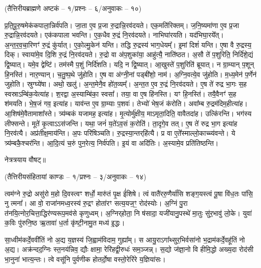 \centerline{\scriptsize (तैत्तिरीयब्राह्मणे अष्टकं – १/प्रश्नः – ६/अनुवाकः – १०)}

प्र॒ति॒पू॒रु॒षमेक॑कपाला॒न्निर्व॑पति। जा॒ता ए॒व प्र॒जा रु॒द्रान्नि॒रव॑दयते। एक॒मति॑\-रिक्तम्। ज॒नि॒ष्यमा॑णा ए॒व प्र॒जा रु॒द्रान्नि॒रव॑दयते। एक॑कपाला भवन्ति। ए॒क॒धैव रु॒द्रं नि॒रव॑दयते। नाभिघा॑रयति। यद॑भिघा॒रये᳚त्। अ॒न्त॒र॒व॒चा॒रिणꣳ॑ रु॒द्रं कु॑र्यात्। ए॒को॒ल्मु॒केन॑ यन्ति।
तद्धि रु॒द्रस्य॑ भाग॒धेयम्᳚। इ॒मां दिशं॑ यन्ति। ए॒षा वै रु॒द्रस्य॒ दिक्। स्वाया॑मे॒व दि॒शि रु॒द्रं नि॒रव॑दयते। रु॒द्रो वा अ॑प॒शुका॑या॒ आहु॑त्यै॒ नाति॑ष्ठत। अ॒सौ ते॑ प॒शुरिति॒ निर्दि॑शे॒द्यं द्वि॒ष्यात्। यमे॒व द्वेष्टि॑। तम॑स्मै प॒शुं निर्दि॑शति। यदि॒ न द्वि॒ष्यात्। आ॒खुस्ते॑ प॒शुरिति॑ ब्रूयात्।
न ग्रा॒म्यान् प॒शून् हि॒नस्ति॑। नार॒ण्यान्। च॒तु॒ष्प॒थे जु॑होति। ए॒ष वा अ॑ग्नी॒नां पड्बी॑शो॒ नाम॑। अ॒ग्नि॒वत्ये॒व जु॑होति। म॒ध्य॒मेन॑ प॒र्णेन॑ जुहोति। स्रुग्घ्ये॑षा। अथो॒ खलु॑। अ॒न्त॒मेनै॒व हो॑त॒व्यम्᳚। अ॒न्त॒त ए॒व रु॒द्रं नि॒रव॑दयते।
ए॒ष ते॑ रुद्र भा॒गः स॒ह स्वस्राऽम्बि॑क॒येत्या॑ह। श॒रद्वा अ॒स्याम्बि॑का॒ स्वसा᳚। तया॒ वा ए॒ष हि॑नस्ति। यꣳ हि॒नस्ति॑। तयै॒वैनꣳ॑ स॒ह श॑मयति। भे॒ष॒जं गव॒ इत्या॑ह। याव॑न्त ए॒व ग्रा॒म्याः प॒शवः॑। तेभ्यो॑ भेष॒जं क॑रोति। अवा᳚म्ब रु॒द्रम॑दिम॒हीत्या॑ह। आ॒शिष॑मे॒वैतामाशा᳚स्ते।
त्र्य॑म्बकं यजामह॒ इत्या॑ह। मृ॒त्योर्मु॑क्षीय॒ माऽमृता॒दिति॒ वावैतदा॑ह। उत्कि॑रन्ति। भग॑स्य लीफ्सन्ते। मूते॑ कृ॒त्वाऽऽस॑जन्ति। यथा॒ जनं॑ य॒ते॑ऽव॒सं क॒रोति॑। ता॒दृगे॒व तत्। ए॒ष ते॑ रुद्र भा॒ग इत्या॑ह नि॒रव॑त्यै। अप्र॑तीक्ष॒माय॑न्ति। अ॒पः परि॑षिञ्चति। \mbox{रु॒द्रस्या॒न्तर्‌\mbox{}हि॑त्यै}। प्र वा ए॒ते᳚स्माल्लो॒काच्च्य॑वन्ते। ये त्र्य॑म्बकै॒श्चर॑न्ति। आ॒दि॒त्यं च॒रुं पुन॒रेत्य॒ निर्व॑पति। इ॒यं वा अदि॑तिः। अ॒स्यामे॒व प्रति॑तिष्ठन्ति।

नेत्रत्रयाय वौषट्॥

{\small\closesection}


{}
\centerline{\scriptsize (तैत्तिरीयसंहितायां काण्डः – १/प्रश्नः – ३/अनुवाकः – १४)}

त्वम॑ग्ने रु॒द्रो असु॑रो म॒हो दि॒वस्त्वꣳ शर्धो॒ मारु॑तं पृ॒क्ष ई॑शिषे। त्वं वातै॑ररु॒णैर्या॑सि शङ्ग॒यस्त्वं पू॒षा वि॑ध॒तः पा॑सि॒ नु त्मना᳚।
आ वो॒ राजा॑नमध्व॒रस्य॑ रु॒द्रꣳ होता॑रꣳ सत्य॒यज॒ꣳ॒ रोद॑स्योः। अ॒ग्निं पु॒रा त॑नयि॒त्नोर॒चित्ता॒द्धिर॑ण्यरूप॒मव॑से कृणुध्वम्। अ॒ग्निर्‌होता॒ नि ष॑सादा॒ यजी॑यानु॒पस्थे॑ मा॒तुः सु॑र॒भावु॑ लो॒के। युवा॑ क॒विः पु॑रुनि॒ष्ठ ऋ॒तावा॑ ध॒र्ता कृ॑ष्टी॒नामु॒त मध्य॑ इ॒द्धः।

सा॒ध्वीम॑कर्दे॒ववी॑तिं नो अ॒द्य य॒ज्ञस्य॑ जि॒ह्वाम॑विदाम॒ गुह्या᳚म्। स आयु॒रा\-ऽ\-गा᳚थ्सुर॒भिर्वसा॑नो भ॒द्राम॑कर्दे॒वहू॑तिं नो अ॒द्य। अक्र॑न्दद॒ग्निः स्त॒नय॑न्निव॒ द्यौः क्षामा॒ रेरि॑हद्वी॒रुधः॑ सम॒ञ्जन्न्। स॒द्यो ज॑ज्ञा॒नो वि हीमि॒द्धो अख्य॒दा रोद॑सी भा॒नुना॑ भात्य॒न्तः। त्वे वसू॑नि पुर्वणीक होतर्दो॒षा वस्तो॒रेरि॑रे य॒ज्ञिया॑सः।

